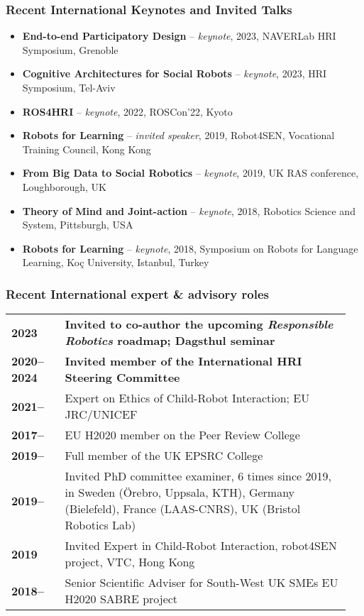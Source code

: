 \subsubsection{Recent International Keynotes and Invited Talks}

\begin{itemize}
    \item {\textbf{End-to-end Participatory Design} -- \textit{keynote}, 2023,
        NAVERLab HRI Symposium, Grenoble} 
    \item {\textbf{Cognitive Architectures for Social Robots} --
        \textit{keynote}, 2023, HRI Symposium, Tel-Aviv} 
    \item {\textbf{ROS4HRI} -- \textit{keynote}, 2022, ROSCon'22, Kyoto} 
    \item {\textbf{Robots for Learning} -- \textit{invited speaker}, 2019, Robot4SEN,
Vocational Training Council, Kong Kong} 
\item {\textbf{From Big Data to Social Robotics} -- \textit{keynote}, 2019, UK
    RAS conference, Loughborough, UK} 
\item {\textbf{Theory of Mind and Joint-action} -- \textit{keynote}, 2018, Robotics Science and System, Pittsburgh, USA} 
\item {\textbf{Robots for Learning} -- \textit{keynote}, 2018, Symposium on Robots for Language Learning,  Koç University, Istanbul, Turkey} 
\end{itemize}


\subsubsection{Recent International expert \& advisory roles}

\begin{tabular}{p{0.15\linewidth}p{0.8\linewidth}}
    {\bf 2023} & {\bf Invited to co-author the upcoming \emph{Responsible
    Robotics} roadmap; Dagsthul seminar}  \\
    {\bf 2020--2024} & {\bf Invited member of the International HRI Steering Committee} \\
    {\bf 2021--} & {Expert on Ethics of Child-Robot Interaction; EU JRC/UNICEF} \\
    {\bf 2017--} & {EU H2020 member on the Peer Review College} \\
    {\bf 2019--} & {Full member of the UK EPSRC College} \\
    {\bf 2019--} & {Invited PhD committee examiner, 6 times since 2019, in Sweden
(Örebro, Uppsala, KTH), Germany (Bielefeld), France (LAAS-CNRS), UK (Bristol
Robotics Lab)} \\
    {\bf 2019} & {Invited Expert in Child-Robot Interaction, robot4SEN project,
	VTC, Hong Kong} \\
    {\bf 2018--} & {Senior Scientific Adviser for South-West UK SMEs} {EU H2020 SABRE project} \\
\end{tabular}

